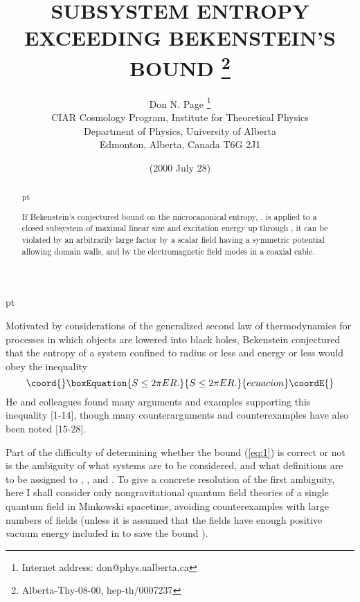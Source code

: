 \documentclass[a4paper,12pt]{article}
\begin{document}
\title{{\bf SUBSYSTEM ENTROPY
\\ EXCEEDING BEKENSTEIN'S BOUND}
\thanks{Alberta-Thy-08-00, hep-th/0007237}}
\author{
Don N. Page
\thanks{Internet address:
don@phys.ualberta.ca}
\\
CIAR Cosmology Program, Institute for Theoretical Physics\\
Department of Physics, University of Alberta\\
Edmonton, Alberta, Canada T6G 2J1
}
\date{(2000 July 28)}
\maketitle
\large

\begin{abstract}
 pt

	If Bekenstein's conjectured bound
on the microcanonical entropy,
\coordHE{},
is applied to a closed subsystem
of maximal linear size \coordHE{}
and excitation energy up through \coordHE{},
it can be violated by an arbitrarily large factor
by a scalar field having a symmetric potential
allowing domain walls, and
by the electromagnetic field modes
in a coaxial cable.

\end{abstract}
\normalsize
{} pt
\newpage

	Motivated by considerations
of the generalized second law of thermodynamics
for processes in which objects are lowered into black holes,
Bekenstein
\cite{Bek1}
conjectured that the entropy \coordHE{}
of a system confined to radius \coordHE{}
or less and energy \coordHE{} or less
would obey the inequality
 \begin{equation}\coord{}\boxEquation{
 S \leq 2 \pi E R.
 \label{eq:1}
 }{
 S \leq 2 \pi E R.
 }{ecuacion}\coordE{}\end{equation}
He and colleagues found many arguments and examples
supporting this inequality
[1-14],
though many counterarguments and counterexamples
have also been noted
[15-28].

	Part of the difficulty of determining
whether the bound (\ref{eq:1}) is correct or not
is the ambiguity of what systems are to be considered,
and what definitions are to be assigned to \coordHE{}, \coordHE{}, and \coordHE{}.
To give a concrete resolution of the first ambiguity,
here I shall consider only nongravitational quantum field theories
of a single quantum field in Minkowski spacetime,
avoiding counterexamples with large numbers of fields
\cite{Page1,UW1,FMW}
(unless it is assumed that the fields have
enough positive vacuum energy included in \coordHE{}
to save the bound
\cite{Bek3,Bek6,Bek7}).
\end{document}
